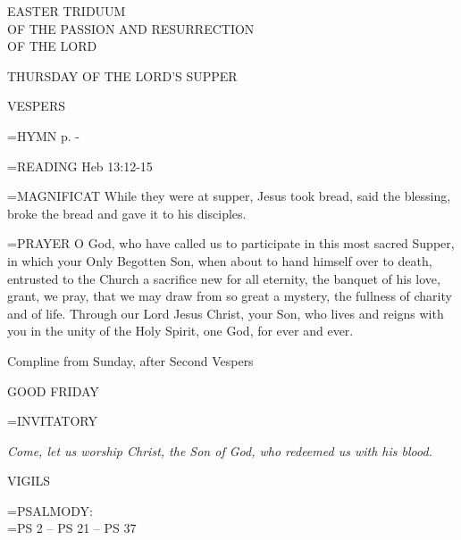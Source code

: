 \begin{center}\normalsize EASTER TRIDUUM\\
\footnotesize OF THE PASSION AND RESURRECTION\\
\footnotesize OF THE LORD\\
\end{center}

THURSDAY OF THE LORD'S SUPPER

\begin{flushleft}\normalsize VESPERS\\\end{flushleft}

\hangindent=\parindent \small{\uppercase{HYMN} p. \pageref{lent:firstHymn}-\pageref{lent:lastHymn}\\}

\hangindent=\parindent \small{\uppercase{READING}}    Heb 13:12-15 \textbf{   \\}

\hangindent=\parindent \small{MAGNIFICAT 	While they were at supper, Jesus took bread, said the blessing, broke the bread and gave it to his disciples.\\}

\hangindent=\parindent \small{PRAYER 	O God, who have called us to participate in this most sacred Supper, in which your Only Begotten Son, when about to hand himself over to death, entrusted to the Church a sacrifice new for all eternity, the banquet of his love, grant, we pray, that we may draw from so great a mystery, the fullness of charity and of life. Through our Lord Jesus Christ, your Son, who lives and reigns with you in the unity of the Holy Spirit, one God, for ever and ever.}

Compline from Sunday, after Second Vespers

GOOD FRIDAY

\hangindent=\parindent \small{INVITATORY}
\begin{center}
\textit{Come, let us worship Christ, the Son of God, who redeemed us with his blood.\\}
\end{center}

\begin{flushleft}\normalsize VIGILS\\\end{flushleft}

\hangindent=\parindent \small{PSALMODY:}\\
\hangindent=\parindent  PS 2 -- PS 21 -- PS 37\vspace{0.5em}

